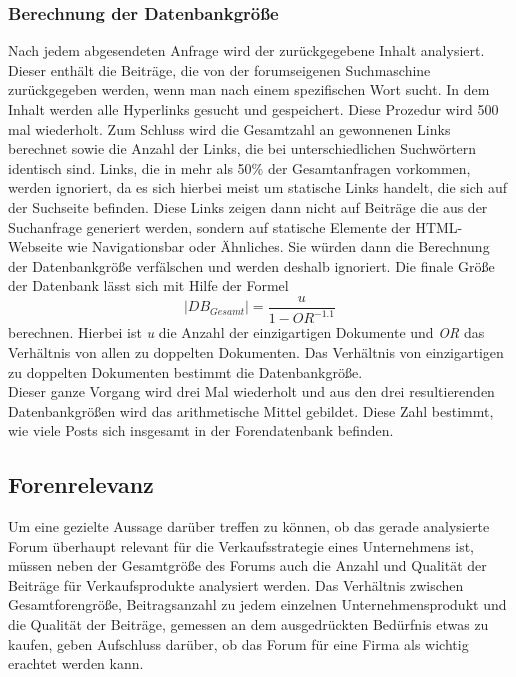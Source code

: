\subsubsection{Berechnung der Datenbankgröße}
Nach jedem abgesendeten Anfrage wird der zurückgegebene Inhalt analysiert. Dieser enthält die Beiträge, die von der 
forumseigenen Suchmaschine zurückgegeben werden, wenn man nach einem spezifischen Wort sucht. In dem Inhalt werden alle Hyperlinks gesucht und gespeichert. Diese Prozedur wird 500 mal wiederholt. Zum Schluss wird die Gesamtzahl an gewonnenen Links berechnet sowie die Anzahl der Links, die bei unterschiedlichen Suchwörtern identisch sind. Links, die in mehr als 50\% der Gesamtanfragen vorkommen, werden ignoriert, da es sich hierbei meist um statische Links handelt, die sich auf der Suchseite befinden. Diese Links zeigen dann nicht auf Beiträge die aus der Suchanfrage generiert werden, sondern auf statische Elemente der HTML-Webseite wie Navigationsbar oder Ähnliches. Sie würden dann die Berechnung der Datenbankgröße verfälschen und werden deshalb ignoriert.
Die finale Größe der Datenbank lässt sich mit Hilfe der Formel \[|DB_{Gesamt}| = \frac{u}{1-OR^{-1.1}}\] berechnen. Hierbei ist \textit{u} die Anzahl der einzigartigen Dokumente und \textit{OR} das Verhältnis von allen zu doppelten Dokumenten. Das Verhältnis von einzigartigen zu doppelten Dokumenten bestimmt die Datenbankgröße\cite{lu2008efficient}.\\
Dieser ganze Vorgang wird drei Mal wiederholt und aus den drei resultierenden Datenbankgrößen wird das arithmetische Mittel gebildet. Diese Zahl bestimmt, wie viele Posts sich insgesamt in der Forendatenbank befinden.



\subsection{Forenrelevanz}
Um eine gezielte Aussage darüber treffen zu können, ob das gerade analysierte Forum überhaupt relevant für die Verkaufsstrategie eines Unternehmens ist, müssen neben der Gesamtgröße des Forums auch die Anzahl und Qualität der Beiträge für Verkaufsprodukte analysiert werden. Das Verhältnis zwischen Gesamtforengröße, Beitragsanzahl zu jedem einzelnen Unternehmensprodukt und die Qualität der Beiträge, gemessen an dem ausgedrückten Bedürfnis etwas zu kaufen, geben Aufschluss darüber, ob das Forum für eine Firma als wichtig erachtet werden kann.

